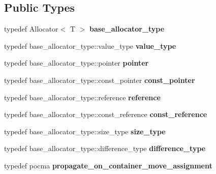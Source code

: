 \subsection*{Public Types}
\begin{DoxyCompactItemize}
\item 
\hypertarget{classstateful__allocator_a2806004ec2cb1ea12d4b4f40547e0c1d}{}typedef Allocator$<$ T $>$ {\bfseries base\+\_\+allocator\+\_\+type}\label{classstateful__allocator_a2806004ec2cb1ea12d4b4f40547e0c1d}

\item 
\hypertarget{classstateful__allocator_ab8c7259560686fb84151f0f09d55735e}{}typedef base\+\_\+allocator\+\_\+type\+::value\+\_\+type {\bfseries value\+\_\+type}\label{classstateful__allocator_ab8c7259560686fb84151f0f09d55735e}

\item 
\hypertarget{classstateful__allocator_a4d0d2baa22647196c4fda7a54b7eff50}{}typedef base\+\_\+allocator\+\_\+type\+::pointer {\bfseries pointer}\label{classstateful__allocator_a4d0d2baa22647196c4fda7a54b7eff50}

\item 
\hypertarget{classstateful__allocator_a0e3e0745c751d74dafb89fde1da5ac09}{}typedef base\+\_\+allocator\+\_\+type\+::const\+\_\+pointer {\bfseries const\+\_\+pointer}\label{classstateful__allocator_a0e3e0745c751d74dafb89fde1da5ac09}

\item 
\hypertarget{classstateful__allocator_a1e057eeade9a8ba1854a90dcd302656b}{}typedef base\+\_\+allocator\+\_\+type\+::reference {\bfseries reference}\label{classstateful__allocator_a1e057eeade9a8ba1854a90dcd302656b}

\item 
\hypertarget{classstateful__allocator_aa25f15b4ffca90b42064270657592737}{}typedef base\+\_\+allocator\+\_\+type\+::const\+\_\+reference {\bfseries const\+\_\+reference}\label{classstateful__allocator_aa25f15b4ffca90b42064270657592737}

\item 
\hypertarget{classstateful__allocator_ae46dff61d36c08bac0f12f0728f674e6}{}typedef base\+\_\+allocator\+\_\+type\+::size\+\_\+type {\bfseries size\+\_\+type}\label{classstateful__allocator_ae46dff61d36c08bac0f12f0728f674e6}

\item 
\hypertarget{classstateful__allocator_a77c66511d5180347854b6895b25036b4}{}typedef base\+\_\+allocator\+\_\+type\+::difference\+\_\+type {\bfseries difference\+\_\+type}\label{classstateful__allocator_a77c66511d5180347854b6895b25036b4}

\item 
\hypertarget{classstateful__allocator_aadb39df4b7ee6b0806d969697a1846ff}{}typedef pocma {\bfseries propagate\+\_\+on\+\_\+container\+\_\+move\+\_\+assignment}\label{classstateful__allocator_aadb39df4b7ee6b0806d969697a1846ff}

\end{DoxyCompactItemize}
